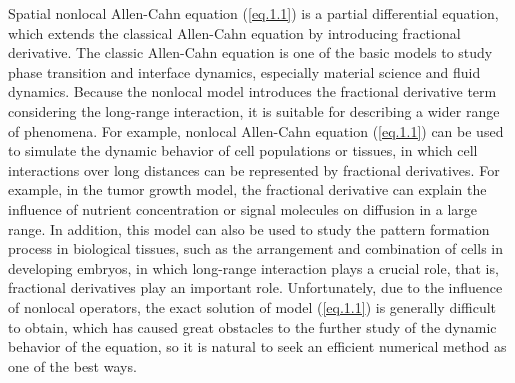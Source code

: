 \documentclass{siamart171218}
\numberwithin{theorem}{section}
\numberwithin{equation}{section}
\begin{document}
Spatial nonlocal Allen-Cahn equation (\ref{eq.1.1}) is
a partial differential equation, which extends the classical
 Allen-Cahn equation by introducing fractional derivative. The classic Allen-Cahn equation is one of the basic
  models to study phase transition and interface dynamics,
  especially material science and fluid dynamics. Because
  the nonlocal model introduces the fractional derivative
  term considering the long-range interaction, it is suitable
   for describing a wider range of phenomena.
For example, nonlocal Allen-Cahn equation (\ref{eq.1.1}) can be
used to simulate the dynamic behavior of cell populations or
tissues, in which cell interactions over long distances can be
 represented by fractional derivatives. For example, in the
 tumor growth model, the fractional derivative can explain the
  influence of nutrient concentration or signal molecules on
  diffusion in a large range. In addition, this model can also
   be used to study the pattern formation process in biological
    tissues, such as the arrangement and combination of cells
    in developing embryos, in which long-range interaction
    plays a crucial role, that is, fractional derivatives
     play an important role.
Unfortunately, due to the influence of nonlocal operators,
the exact solution of model (\ref{eq.1.1}) is generally difficult to
obtain, which has caused great obstacles to the further
study of the dynamic behavior of the equation, so it
is natural to seek an efficient numerical method as one of the best ways.
\end{document}
